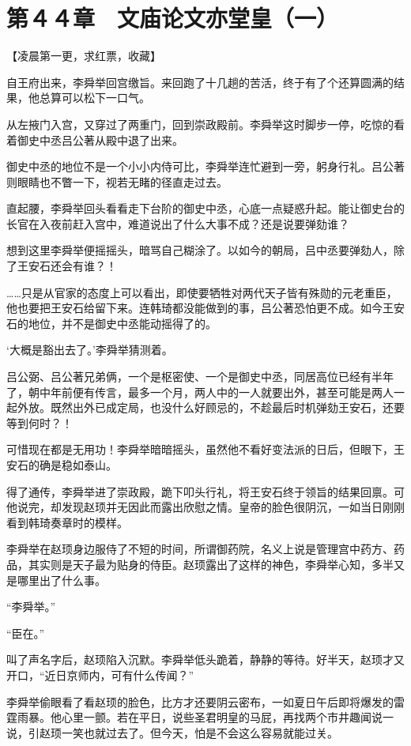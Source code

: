 \section{第４４章　文庙论文亦堂皇（一）}

【凌晨第一更，求红票，收藏】

自王府出来，李舜举回宫缴旨。来回跑了十几趟的苦活，终于有了个还算圆满的结果，他总算可以松下一口气。

从左掖门入宫，又穿过了两重门，回到崇政殿前。李舜举这时脚步一停，吃惊的看着御史中丞吕公著从殿中退了出来。

御史中丞的地位不是一个小小内侍可比，李舜举连忙避到一旁，躬身行礼。吕公著则眼睛也不瞥一下，视若无睹的径直走过去。

直起腰，李舜举回头看看走下台阶的御史中丞，心底一点疑惑升起。能让御史台的长官在入夜前赶入宫中，难道说出了什么大事不成？还是说要弹劾谁？

想到这里李舜举便摇摇头，暗骂自己糊涂了。以如今的朝局，吕中丞要弹劾人，除了王安石还会有谁？！

……只是从官家的态度上可以看出，即使要牺牲对两代天子皆有殊勋的元老重臣，他也要把王安石给留下来。连韩琦都没能做到的事，吕公著恐怕更不成。如今王安石的地位，并不是御史中丞能动摇得了的。

‘大概是豁出去了。’李舜举猜测着。

吕公弼、吕公著兄弟俩，一个是枢密使、一个是御史中丞，同居高位已经有半年了，朝中年前便有传言，最多一个月，两人中的一人就要出外，甚至可能是两人一起外放。既然出外已成定局，也没什么好顾忌的，不趁最后时机弹劾王安石，还要等到何时？！

可惜现在都是无用功！李舜举暗暗摇头，虽然他不看好变法派的日后，但眼下，王安石的确是稳如泰山。

得了通传，李舜举进了崇政殿，跪下叩头行礼，将王安石终于领旨的结果回禀。可他说完，却发现赵顼并无因此而露出欣慰之情。皇帝的脸色很阴沉，一如当日刚刚看到韩琦奏章时的模样。

李舜举在赵顼身边服侍了不短的时间，所谓御药院，名义上说是管理宫中药方、药品，其实则是天子最为贴身的侍臣。赵顼露出了这样的神色，李舜举心知，多半又是哪里出了什么事。

“李舜举。”

“臣在。”

叫了声名字后，赵顼陷入沉默。李舜举低头跪着，静静的等待。好半天，赵顼才又开口，“近日京师内，可有什么传闻？”

李舜举偷眼看了看赵顼的脸色，比方才还要阴云密布，一如夏日午后即将爆发的雷霆雨暴。他心里一颤。若在平日，说些圣君明皇的马屁，再找两个市井趣闻说一说，引赵顼一笑也就过去了。但今天，怕是不会这么容易就能过关。

